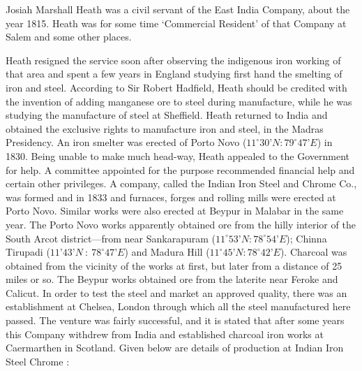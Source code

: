 Josiah Marshall Heath was a civil servant of the East India Company, about the year 1815.  Heath was for some time `Commercial Resident' of that Company at Salem and some other places.

\newpage

Heath resigned the service soon after observing the indigenous iron working of that area and spent a few years in England studying first hand the smelting of iron and steel. According to Sir Robert Hadfield, Heath should be credited with the invention of adding manganese ore to steel during manufacture, while he was studying the manufacture of steel at Sheffield. Heath returned to India and obtained the exclusive rights to manufacture iron and steel, in the Madras Presidency. An iron smelter was erected of Porto Novo ($11^\circ 30’N:79^\circ 47’E$) in 1830. Being unable to make much head-way, Heath appealed to the Government for help. A committee appointed for the purpose recommended financial help and certain other privileges. A company, called the Indian Iron Steel and Chrome Co., was formed and in 1833 and furnaces, forges and rolling mills were erected at Porto Novo. Similar works were also erected at Beypur in Malabar in the same year. The Porto Novo works apparently obtained ore from the hilly interior of the South Arcot district—from near Sankarapuram ($11^\circ 53’N: 78^\circ 54’E$); Chinna Tirupadi ($11’ 43’N~:~78^\circ 47’E$) and Madura Hill ($11^\circ 45’N: 78^\circ 42’E$). Charcoal was obtained from the vicinity of the works at first, but later from a distance of 25 miles or so. The Beypur works obtained ore from the laterite near Feroke and Calicut. In order to test the steel and market an approved quality, there was an establishment at Chelsea, London through which all the steel manufactured here passed. The venture was fairly successful, and it is stated that after some years this Company withdrew from India and established charcoal iron works at Caermarthen in Scotland. Given below are details of production at Indian Iron Steel Chrome :

